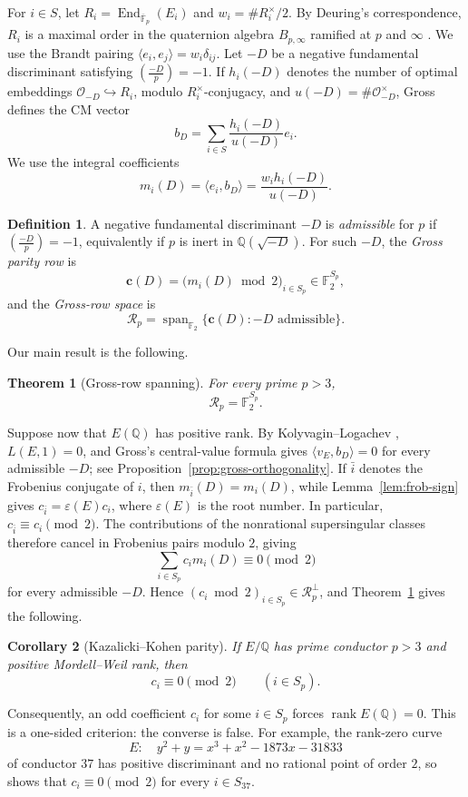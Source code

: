 \documentclass[11pt]{amsart}
\newtheorem{theorem}{Theorem}[section]
\newtheorem{corollary}[theorem]{Corollary}
\theoremstyle{definition}
\newtheorem*{definition*}{Definition}
\theoremstyle{remark}
\newcommand{\Q}{\mathbb{Q}}
\newcommand{\F}{\mathbb{F}}
\newcommand{\OO}{\mathcal{O}}
\newcommand{\End}{\operatorname{End}}
\newcommand{\Span}{\operatorname{span}}
\newcommand{\leg}[2]{\left(\frac{#1}{#2}\right)}
\newcommand{\crow}{\mathbf{c}}
\newcommand{\Rp}{\mathcal{R}_p}
\begin{document}
For $i\in S$, let $R_i=\End_{\overline{\F}_p}(E_i)$ and $w_i=\#R_i^\times/2$. By Deuring's correspondence, $R_i$ is a maximal order in the quaternion algebra $B_{p,\infty}$ ramified at $p$ and $\infty$ \cite{Deuring1941}. We use the Brandt pairing $\langle e_i,e_j\rangle=w_i\delta_{ij}$. Let $-D$ be a negative fundamental discriminant satisfying $\leg{-D}{p}=-1$. If $h_i(-D)$ denotes the number of optimal embeddings $\OO_{-D}\hookrightarrow R_i$, modulo $R_i^\times$-conjugacy, and $u(-D)=\#\OO_{-D}^{\times}$, Gross \cite[Sections~12--13]{Gross1987} defines the CM vector
\[
  b_D=\sum_{i\in S}\frac{h_i(-D)}{u(-D)}e_i.
\]
We use the integral coefficients
\[
  m_i(D)=\langle e_i,b_D\rangle=\frac{w_i h_i(-D)}{u(-D)}.
\]

\begin{definition*}
A negative fundamental discriminant $-D$ is \emph{admissible} for $p$ if $\leg{-D}{p}=-1$, equivalently if $p$ is inert in $\Q(\sqrt{-D})$. For such $-D$, the \emph{Gross parity row} is
\[
  \crow(D)=\bigl(m_i(D)\bmod2\bigr)_{i\in S_p}\in\F_2^{S_p},
\]
and the \emph{Gross-row space} is
\[
  \Rp=\Span_{\F_2}\{\crow(D):-D\text{ admissible}\}.
\]
\end{definition*}

Our main result is the following.

\begin{theorem}[Gross-row spanning]\label{thm:spanning}
For every prime $p>3$,
\[
  \Rp=\F_2^{S_p}.
\]
\end{theorem}

Suppose now that $E(\Q)$ has positive rank. By Kolyvagin--Logachev \cite[Theorem~0.3]{KolyvaginLogachev1990}, $L(E,1)=0$, and Gross's central-value formula \cite[Proposition~13.5]{Gross1987} gives $\langle v_E,b_D\rangle=0$ for every admissible $-D$; see Proposition~\ref{prop:gross-orthogonality}. If $\bar i$ denotes the Frobenius conjugate of $i$, then $m_{\bar i}(D)=m_i(D)$, while Lemma~\ref{lem:frob-sign} gives $c_{\bar i}=\varepsilon(E)c_i$, where $\varepsilon(E)$ is the root number. In particular, $c_{\bar i}\equiv c_i\pmod2$. The contributions of the nonrational supersingular classes therefore cancel in Frobenius pairs modulo $2$, giving
\[
  \sum_{i\in S_p}c_i m_i(D)\equiv0\pmod2
\]
for every admissible $-D$. Hence $(c_i\bmod2)_{i\in S_p}\in\Rp^\perp$, and Theorem~\ref{thm:spanning} gives the following.

\begin{corollary}[Kazalicki--Kohen parity]\label{cor:parity}
If $E/\Q$ has prime conductor $p>3$ and positive Mordell--Weil rank, then
\[
  c_i\equiv0\pmod2\qquad(i\in S_p).
\]
\end{corollary}
Consequently, an odd coefficient $c_i$ for some $i\in S_p$ forces $\operatorname{rank}E(\Q)=0$. This is a one-sided criterion: the converse is false. For example, the rank-zero curve
\[
  E:\quad y^2+y=x^3+x^2-1873x-31833
\]
of conductor $37$ has positive discriminant and no rational point of order
$2$, so \cite[Theorem~1.4]{KazalickiKohen2017} shows that
$c_i\equiv0\pmod2$ for every $i\in S_{37}$.
\end{document}
